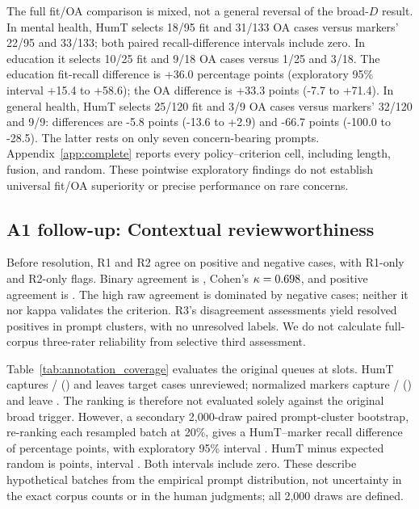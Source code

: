 \documentclass[manuscript,screen,review,anonymous]{acmart}
\begin{document}
The full fit/OA comparison is mixed, not a general reversal of the broad-$D$ result. In mental health, HumT selects 18/95 fit and 31/133 OA cases versus markers' 22/95 and 33/133; both paired recall-difference intervals include zero. In education it selects 10/25 fit and 9/18 OA cases versus 1/25 and 3/18. The education fit-recall difference is +36.0 percentage points (exploratory 95\% interval +15.4 to +58.6); the OA difference is +33.3 points (-7.7 to +71.4). In general health, HumT selects 25/120 fit and 3/9 OA cases versus markers' 32/120 and 9/9: differences are -5.8 points (-13.6 to +2.9) and -66.7 points (-100.0 to -28.5). The latter rests on only seven concern-bearing prompts. Appendix~\ref{app:complete} reports every policy--criterion cell, including length, fusion, and random. These pointwise exploratory findings do not establish universal fit/OA superiority or precise performance on rare concerns.

\subsection{A1 follow-up: Contextual reviewworthiness}\label{sec:assessmentresults}
Before resolution, R1 and R2 agree on \IABothYes{} positive and \IABothNo{} negative cases, with \IAOnlyFirst{} R1-only and \IAOnlySecond{} R2-only flags. Binary agreement is \IAAgreement{}, Cohen's $\kappa=0.698{}$, and positive agreement is \IAPositiveAgreement{}. The high raw agreement is dominated by negative cases; neither it nor kappa validates the criterion. R3's disagreement assessments yield \IAPositive{} resolved positives in \IAClusters{} prompt clusters, with no unresolved labels. We do not calculate full-corpus three-rater reliability from selective third assessment.

Table~\ref{tab:annotation_coverage} evaluates the original queues at \IASlots{} slots. HumT captures \IAHCaught{}/\IAPositive{} (\IAHRecall{}) and leaves \IAHMissed{} target cases unreviewed; normalized markers capture \IAMCaught{}/\IAPositive{} (\IAMRecall{}) and leave \IAMMissed{}. The ranking is therefore not evaluated solely against the original broad trigger. However, a secondary 2,000-draw paired prompt-cluster bootstrap, re-ranking each resampled batch at 20\%, gives a HumT--marker recall difference of \IAHDeltaMarkers{} percentage points, with exploratory 95\% interval \IAHMarkersInterval{}. HumT minus expected random is \IAHDeltaRandom{} points, interval \IAHRandomInterval{}. Both intervals include zero. These describe hypothetical batches from the empirical prompt distribution, not uncertainty in the exact corpus counts or in the human judgments; all 2,000 draws are defined.

\end{document}
